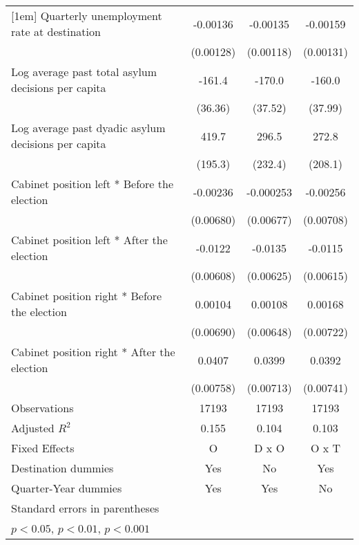 \begin{table}[htbp]
\begin{tabular}{l*{3}{c}}
[1em]
Quarterly unemployment rate at destination&    -0.00136         &    -0.00135         &    -0.00159         \\
                    &   (0.00128)         &   (0.00118)         &   (0.00131)         \\
[1em]
Log average past total asylum decisions per capita&      -161.4\sym{***}&      -170.0\sym{***}&      -160.0\sym{***}\\
                    &     (36.36)         &     (37.52)         &     (37.99)         \\
[1em]
Log average past dyadic asylum decisions per capita&       419.7\sym{*}  &       296.5         &       272.8         \\
                    &     (195.3)         &     (232.4)         &     (208.1)         \\
[1em]
Cabinet position left * Before the election&    -0.00236         &   -0.000253         &    -0.00256         \\
                    &   (0.00680)         &   (0.00677)         &   (0.00708)         \\
[1em]
Cabinet position left * After the election&     -0.0122         &     -0.0135\sym{*}  &     -0.0115         \\
                    &   (0.00608)         &   (0.00625)         &   (0.00615)         \\
[1em]
Cabinet position right * Before the election&     0.00104         &     0.00108         &     0.00168         \\
                    &   (0.00690)         &   (0.00648)         &   (0.00722)         \\
[1em]
Cabinet position right * After the election&      0.0407\sym{***}&      0.0399\sym{***}&      0.0392\sym{***}\\
                    &   (0.00758)         &   (0.00713)         &   (0.00741)         \\
\hline
Observations        &       17193         &       17193         &       17193         \\
Adjusted \(R^{2}\)  &       0.155         &       0.104         &       0.103         \\
Fixed Effects       &           O         &       D x O         &       O x T         \\
Destination dummies &         Yes         &          No         &         Yes         \\
Quarter-Year dummies&         Yes         &         Yes         &          No         \\
\hline\hline
\multicolumn{4}{l}{\footnotesize Standard errors in parentheses}\\
\multicolumn{4}{l}{\footnotesize \sym{*} \(p<0.05\), \sym{**} \(p<0.01\), \sym{***} \(p<0.001\)}\\
\end{tabular}
\end{table}
